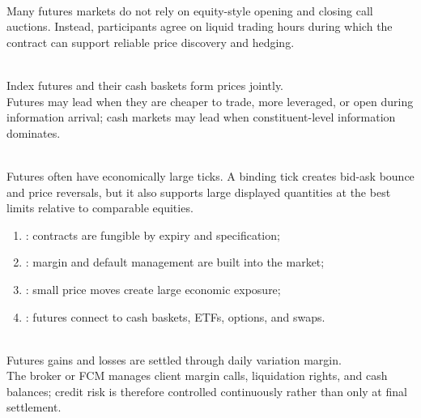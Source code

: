 \documentclass[a4paper,oneside,openany]{book}
\begin{document}
\begin{caveat} \\
Many futures markets do not rely on equity-style opening and closing call auctions. Instead, participants agree on liquid trading hours during which the contract can support reliable price discovery and hedging.
\end{caveat}

\begin{mechanism} \\
Index futures and their cash baskets form prices jointly.\\
Futures may lead when they are cheaper to trade, more leveraged, or open during information arrival; cash markets may lead when constituent-level information dominates.
\end{mechanism}

\begin{principle} \\
Futures often have economically large ticks. A binding tick creates bid-ask bounce and price reversals, but it also supports large displayed quantities at the best limits relative to comparable equities.
\end{principle}

\begin{taxonomy} 
\begin{enumerate}[label=\roman*.]
\setlength{\itemsep}{0pt}
\item {}: contracts are fungible by expiry and specification;
\item {}: margin and default management are built into the market;
\item {}: small price moves create large economic exposure;
\item {}: futures connect to cash baskets, ETFs, options, and swaps.
\end{enumerate}
\end{taxonomy}

\begin{mechanism} \\
Futures gains and losses are settled through daily variation margin.\\
The broker or FCM manages client margin calls, liquidation rights, and cash balances; credit risk is therefore controlled continuously rather than only at final settlement.
\end{mechanism}
\end{document}
